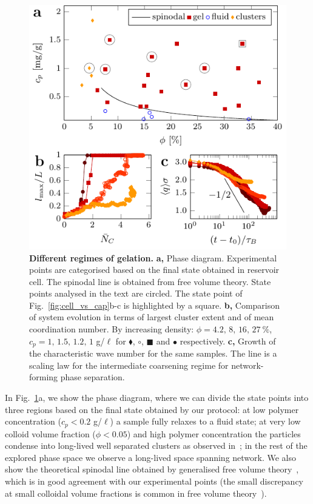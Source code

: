 \documentclass[footinbib,amsmath,amssymb,superscriptaddress,twocolumn]{revtex4}
\begin{document}
\begin{figure}
\includegraphics{figs/phasediag.pdf}
\caption{\textbf{Different regimes of gelation.} \textbf{a,} Phase diagram. Experimental points are categorised based on the final state obtained in reservoir cell. The spinodal line is obtained from free volume theory. State points analysed in the text are circled. The state point of Fig.~\ref{fig:cell_vs_cap}b-c is highlighted by a square. \textbf{b,} Comparison of system evolution in terms of largest cluster extent and of mean coordination number. By increasing density: $\phi=4.2,\,8,\,16,\,27~\%$, $c_p=1,\,1.5,\,1.2,\, 1$ g/$\ell$ for 
{$\blacklozenge$}, 
{$\circ$}, 
{\tiny$\blacksquare$} and 
{$\bullet$} respectively. \textbf{c,} Growth of the characteristic wave number for the same samples. 
The line is a scaling law for the intermediate coarsening regime for network-forming phase separation.}
\label{fig:phasediag}
\end{figure}

In Fig.~\ref{fig:phasediag}a, we show the phase diagram, where we can divide the state points into three regions based on the final state obtained by our protocol: at low polymer concentration ($c_p<0.2$ g/$\ell$) a sample fully relaxes to a fluid state; at very low colloid volume fraction ($\phi<0.05$) and high polymer concentration the particles condense into long-lived well separated clusters as observed in~\cite{Lu2006}; in the rest of the explored phase space we observe a long-lived space spanning network. 
We also show the theoretical spinodal line obtained by generalised free volume theory~\cite{Fleer2008}, which is in good agreement with our experimental points 
(the small discrepancy at small colloidal volume fractions is common in free volume theory~\cite{Shah2003,Bergenholtz2003,lu2008gelation}). 
\end{document}
